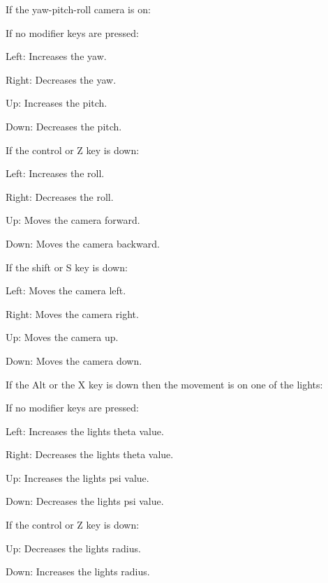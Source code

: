 If the yaw-\/pitch-\/roll camera is on\+:

If no modifier keys are pressed\+:


\begin{DoxyItemize}
\item Left\+: Increases the yaw.
\item Right\+: Decreases the yaw.
\item Up\+: Increases the pitch.
\item Down\+: Decreases the pitch.
\end{DoxyItemize}

If the control or Z key is down\+:


\begin{DoxyItemize}
\item Left\+: Increases the roll.
\item Right\+: Decreases the roll.
\item Up\+: Moves the camera forward.
\item Down\+: Moves the camera backward.
\end{DoxyItemize}

If the shift or S key is down\+:


\begin{DoxyItemize}
\item Left\+: Moves the camera left.
\item Right\+: Moves the camera right.
\item Up\+: Moves the camera up.
\item Down\+: Moves the camera down.
\end{DoxyItemize}

If the Alt or the X key is down then the movement is on one of the lights\+:

If no modifier keys are pressed\+:


\begin{DoxyItemize}
\item Left\+: Increases the light\textquotesingle{}s theta value.
\item Right\+: Decreases the light\textquotesingle{}s theta value.
\item Up\+: Increases the light\textquotesingle{}s psi value.
\item Down\+: Decreases the light\textquotesingle{}s psi value.
\end{DoxyItemize}

If the control or Z key is down\+:


\begin{DoxyItemize}
\item Up\+: Decreases the light\textquotesingle{}s radius.
\item Down\+: Increases the light\textquotesingle{}s radius.
\end{DoxyItemize}

